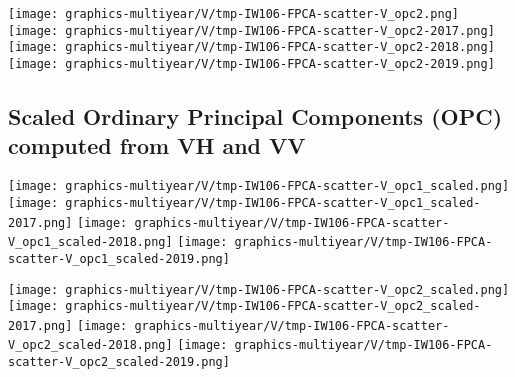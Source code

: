 \clearpage
\begin{center}
\begin{minipage}{7.0in}
\texttt{[image: graphics-multiyear/V/tmp-IW106-FPCA-scatter-V\_opc2.png]}
\quad
\texttt{[image: graphics-multiyear/V/tmp-IW106-FPCA-scatter-V\_opc2-2017.png]}
\vskip 1.0cm
\texttt{[image: graphics-multiyear/V/tmp-IW106-FPCA-scatter-V\_opc2-2018.png]}
\quad
\texttt{[image: graphics-multiyear/V/tmp-IW106-FPCA-scatter-V\_opc2-2019.png]}
\end{minipage}
\end{center}


\clearpage

\subsection{Scaled Ordinary Principal Components (OPC) computed from VH and VV}
\label{FPCA-scatter-opc-scaled}

\begin{center}
\begin{minipage}{7.0in}
\texttt{[image: graphics-multiyear/V/tmp-IW106-FPCA-scatter-V\_opc1\_scaled.png]}
\quad
\texttt{[image: graphics-multiyear/V/tmp-IW106-FPCA-scatter-V\_opc1\_scaled-2017.png]}
\vskip 1.0cm
\texttt{[image: graphics-multiyear/V/tmp-IW106-FPCA-scatter-V\_opc1\_scaled-2018.png]}
\quad
\texttt{[image: graphics-multiyear/V/tmp-IW106-FPCA-scatter-V\_opc1\_scaled-2019.png]}
\end{minipage}
\end{center}


\clearpage
\begin{center}
\begin{minipage}{7.0in}
\texttt{[image: graphics-multiyear/V/tmp-IW106-FPCA-scatter-V\_opc2\_scaled.png]}
\quad
\texttt{[image: graphics-multiyear/V/tmp-IW106-FPCA-scatter-V\_opc2\_scaled-2017.png]}
\vskip 1.0cm
\texttt{[image: graphics-multiyear/V/tmp-IW106-FPCA-scatter-V\_opc2\_scaled-2018.png]}
\quad
\texttt{[image: graphics-multiyear/V/tmp-IW106-FPCA-scatter-V\_opc2\_scaled-2019.png]}
\end{minipage}
\end{center}


\renewcommand{\theenumi}{\roman{enumi}}
\renewcommand{\labelenumi}{\textnormal{(\theenumi)}$\;\;$}

